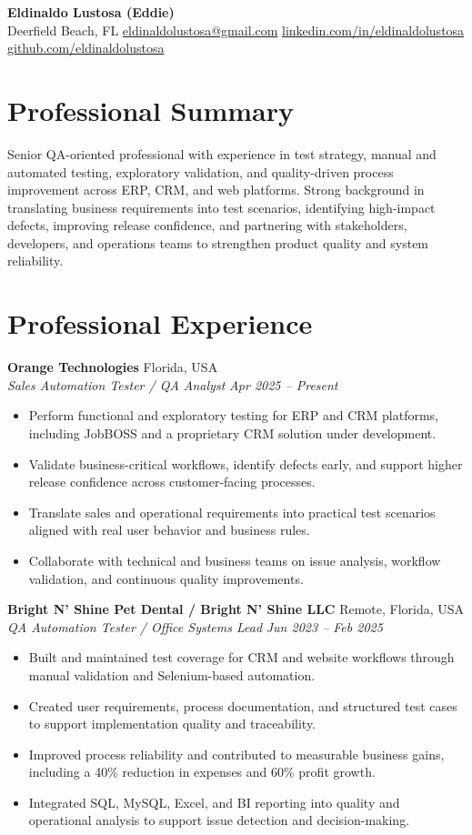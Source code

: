 \documentclass[10pt,letterpaper]{article}
\newcommand{\resumeSubheading}[4]{%
  \textbf{#1} \hfill #2\\
  \textit{#3} \hfill \textit{#4}\par
}
\newcommand{\resumeItem}[1]{\item #1}
\begin{document}
\small

\begin{center}
    {\LARGE \textbf{Eldinaldo Lustosa (Eddie)}}\\[2pt]
    Deerfield Beach, FL \textbar{} \href{mailto:eldinaldolustosa@gmail.com}{eldinaldolustosa@gmail.com} \textbar{} \href{https://www.linkedin.com/in/eldinaldolustosa}{linkedin.com/in/eldinaldolustosa} \textbar{} \href{https://github.com/eldinaldolustosa}{github.com/eldinaldolustosa}
\end{center}

\section*{Professional Summary}
Senior QA-oriented professional with experience in test strategy, manual and automated testing, exploratory validation, and quality-driven process improvement across ERP, CRM, and web platforms. Strong background in translating business requirements into test scenarios, identifying high-impact defects, improving release confidence, and partnering with stakeholders, developers, and operations teams to strengthen product quality and system reliability.

\section*{Professional Experience}

\resumeSubheading{Orange Technologies}{Florida, USA}{Sales Automation Tester / QA Analyst}{Apr 2025 -- Present}
\begin{itemize}
    \resumeItem{Perform functional and exploratory testing for ERP and CRM platforms, including JobBOSS and a proprietary CRM solution under development.}
    \resumeItem{Validate business-critical workflows, identify defects early, and support higher release confidence across customer-facing processes.}
    \resumeItem{Translate sales and operational requirements into practical test scenarios aligned with real user behavior and business rules.}
    \resumeItem{Collaborate with technical and business teams on issue analysis, workflow validation, and continuous quality improvements.}
\end{itemize}

\resumeSubheading{Bright N' Shine Pet Dental / Bright N' Shine LLC}{Remote, Florida, USA}{QA Automation Tester / Office Systems Lead}{Jun 2023 -- Feb 2025}
\begin{itemize}
    \resumeItem{Built and maintained test coverage for CRM and website workflows through manual validation and Selenium-based automation.}
    \resumeItem{Created user requirements, process documentation, and structured test cases to support implementation quality and traceability.}
    \resumeItem{Improved process reliability and contributed to measurable business gains, including a 40\% reduction in expenses and 60\% profit growth.}
    \resumeItem{Integrated SQL, MySQL, Excel, and BI reporting into quality and operational analysis to support issue detection and decision-making.}
\end{itemize}
\end{document}
